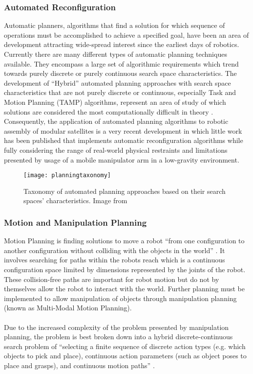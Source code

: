 \subsubsection{Automated Reconfiguration}
Automatic planners, algorithms that find a solution for which sequence of operations must be accomplished to achieve a specified goal, have been an area of development attracting wide-spread interest since the earliest days of robotics. Currently there are many different types of automatic planning techniques available. They encompass a large set of algorithmic requirements which trend towards purely discrete or purely continuous search space characteristics. The development of “Hybrid” automated planning approaches with search space characteristics that are not purely discrete or continuous, especially Task and Motion Planning (TAMP) algorithms, represent an area of study of which solutions are considered the most computationally difficult in theory \cite{Deshpande2020}. Consequently, the application of automated planning algorithms to robotic assembly of modular satellites is a very recent development in which little work has been published that implements automatic reconfiguration algorithms while fully considering the range of real-world physical restraints and limitations presented by usage of a mobile manipulator arm in a low-gravity environment.
\begin{figure*}[!t]
	\centering
	\texttt{[image: planningtaxonomy]}
	\caption{Taxonomy of automated planning approaches based on their search spaces’ characteristics. Image from \cite{huang2023algorithmic}}
	\label{taxonomy}
\end{figure*}
\subsubsection{Motion and Manipulation Planning}
Motion Planning is finding solutions to move a robot “from one configuration to another configuration without colliding with the objects in the world” \cite{huang2023algorithmic}. It involves searching for paths within the robots reach which is a continuous configuration space limited by dimensions represented by the joints of the robot. These collision-free paths are important for robot motion but do not by themselves allow the robot to interact with the world. Further planning must be implemented to allow manipulation of objects through manipulation planning (known as Multi-Modal Motion Planning).
\\\\
Due to the increased complexity of the problem presented by manipulation planning, the problem is best broken down into a hybrid discrete-continuous search problem of “selecting a finite sequence of discrete action types (e.g. which objects to pick and place), continuous action parameters (such as object poses to place and grasps), and continuous motion paths” \cite{huang2023algorithmic}.
